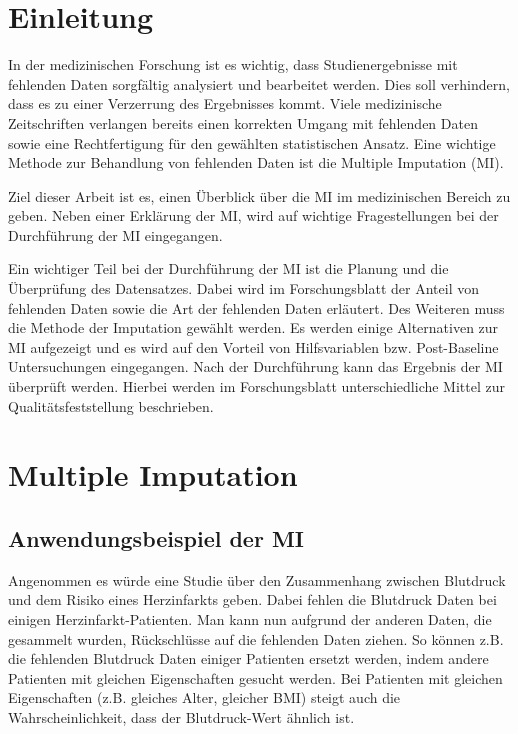 \section{Einleitung}
\label{section:Introduction}

In der medizinischen Forschung ist es wichtig, dass Studienergebnisse mit 
fehlenden Daten sorgfältig analysiert und bearbeitet werden. Dies soll verhindern, dass es zu einer Verzerrung des 
Ergebnisses kommt. Viele medizinische Zeitschriften verlangen bereits einen korrekten Umgang mit fehlenden Daten sowie 
eine Rechtfertigung für den gewählten statistischen Ansatz. \autocite[163]{Lee2014} 
Eine wichtige Methode zur Behandlung von fehlenden Daten ist die Multiple Imputation (MI).

Ziel dieser Arbeit ist es, einen Überblick über die MI im medizinischen Bereich zu geben. Neben einer 
Erklärung der MI, wird auf wichtige Fragestellungen bei der Durchführung der MI eingegangen.

Ein wichtiger Teil bei der Durchführung der MI ist die Planung und die Überprüfung des Datensatzes. 
Dabei wird im Forschungsblatt der Anteil von fehlenden Daten sowie die Art der fehlenden Daten erläutert. 
Des Weiteren muss die Methode der Imputation gewählt werden. Es werden einige Alternativen zur MI aufgezeigt und es 
wird auf den Vorteil von Hilfsvariablen bzw. Post-Baseline Untersuchungen eingegangen. Nach der Durchführung
kann das Ergebnis der MI überprüft werden. Hierbei werden im Forschungsblatt unterschiedliche Mittel zur 
Qualitätsfeststellung beschrieben.


\section{Multiple Imputation}
\label{section:MI}

\subsection{Anwendungsbeispiel der MI}

Angenommen es würde eine Studie über den Zusammenhang zwischen Blutdruck und dem Risiko eines Herzinfarkts geben. 
Dabei fehlen die Blutdruck Daten bei einigen Herzinfarkt-Patienten. Man kann nun aufgrund der anderen Daten, die 
gesammelt wurden, Rückschlüsse auf die fehlenden Daten ziehen. So können z.B. die fehlenden Blutdruck Daten einiger 
Patienten ersetzt werden, indem andere Patienten mit gleichen Eigenschaften gesucht werden. Bei Patienten mit gleichen 
Eigenschaften (z.B. gleiches Alter, gleicher BMI) steigt auch die Wahrscheinlichkeit, dass der Blutdruck-Wert ähnlich ist. 

